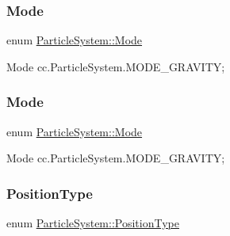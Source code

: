 \subsubsection{\texorpdfstring{Mode}{Mode}\hspace{0.1cm}{\footnotesize\ttfamily [1/2]}}
{\footnotesize\ttfamily enum \hyperlink{classParticleSystem_aa380bd1c6062c44d56268a61ade9c8fb}{Particle\+System\+::\+Mode}\hspace{0.3cm}{\ttfamily [strong]}}

Mode  cc.\+Particle\+System.\+M\+O\+D\+E\+\_\+\+G\+R\+A\+V\+I\+TY; \mbox{\label{classParticleSystem_aa380bd1c6062c44d56268a61ade9c8fb}} 
\subsubsection{\texorpdfstring{Mode}{Mode}\hspace{0.1cm}{\footnotesize\ttfamily [2/2]}}
{\footnotesize\ttfamily enum \hyperlink{classParticleSystem_aa380bd1c6062c44d56268a61ade9c8fb}{Particle\+System\+::\+Mode}\hspace{0.3cm}{\ttfamily [strong]}}

Mode  cc.\+Particle\+System.\+M\+O\+D\+E\+\_\+\+G\+R\+A\+V\+I\+TY; \mbox{\label{classParticleSystem_a9856f9eca1df7c6f2a2e54a1549cff27}} 
\subsubsection{\texorpdfstring{Position\+Type}{PositionType}\hspace{0.1cm}{\footnotesize\ttfamily [1/2]}}
{\footnotesize\ttfamily enum \hyperlink{classParticleSystem_a9856f9eca1df7c6f2a2e54a1549cff27}{Particle\+System\+::\+Position\+Type}\hspace{0.3cm}{\ttfamily [strong]}}

